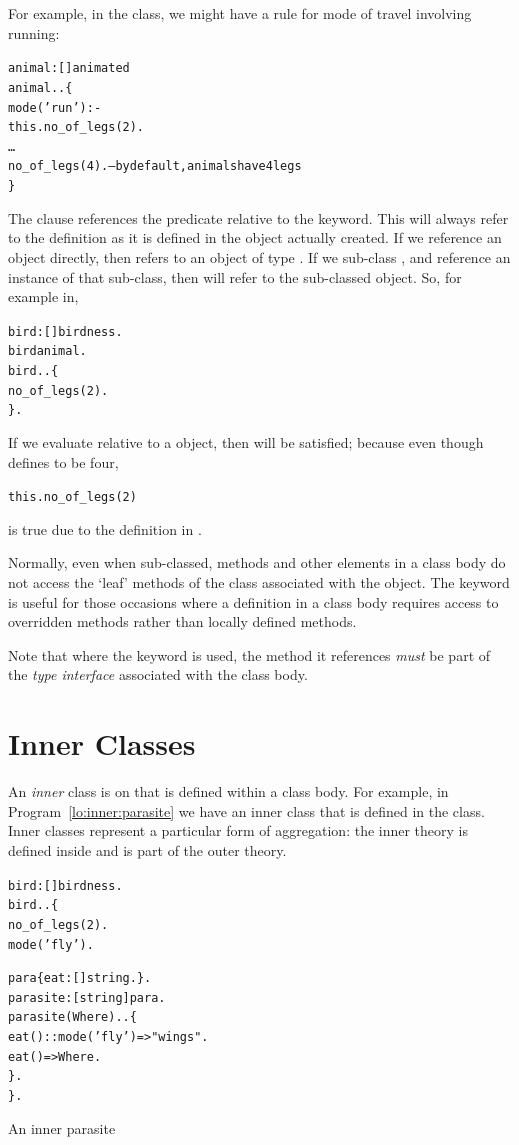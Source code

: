 For example, in the  class, we might have a rule for mode of travel involving running:
\begin{alltt}
animal:[] \conarrow animated
animal..\{
  mode('run') :-
    this.no\_of\_legs(2).
  \ldots
  no\_of\_legs(4).       -- by default, animals have 4 legs
\}
\end{alltt}
The  clause references the  predicate relative to the  keyword. This will always refer to the  definition as it is defined in the object actually created. If we reference an  object directly, then  refers to an object of type . If we sub-class , and reference an instance of that sub-class, then  will refer to the sub-classed object. So, for example in, 
\begin{alltt}
bird:[] \conarrow birdness.
bird\classarrow{}animal.
bird..\{
  no\_of\_legs(2).
\}.
\end{alltt}
If we evaluate  relative to a  object, then  will be satisfied; because even though  defines  to be four,
\begin{alltt}
this.no\_of\_legs(2)
\end{alltt}
is true due to the definition in .

Normally, even when sub-classed, methods and other elements in a class body do not access the `leaf' methods of the class associated with the object. The  keyword is useful for those occasions where a definition in a class body requires access to overridden methods rather than locally defined methods.

Note that where the  keyword is used, the method it references \emph{must} be part of the \emph{type interface} associated with the class body.


\section{Inner Classes}
\label{lo:inner}
An \emph{inner} class is on that is defined within a class body. For example, in Program~\vref{lo:inner:parasite} we have an inner  class that is defined in the  class. Inner classes represent a particular form of aggregation: the inner theory is defined inside and is part of the outer theory.

\begin{program}
\vspace{0.5ex}
\begin{alltt}
bird:[]\conarrow{}birdness.
bird..\{
  no_of_legs(2).
  mode('fly').
  
  para\impl{}\{ eat:[]\funarrow{}string. \}.
  parasite:[string]\conarrow{}para.
  parasite(Where)..\{
    eat()::mode('fly')=>"wings".
    	eat()=>Where.
  \}.
\}.
\end{alltt}
\vspace{-2ex}
\caption{An inner parasite}
\label{lo:inner:parasite}
\end{program}

